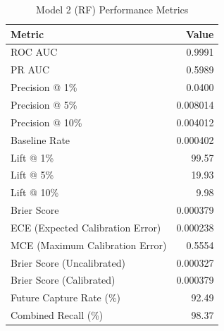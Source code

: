 \begin{table}[h]
\centering
\begin{tabular}{lr}
\toprule
Metric & Value \\
\midrule
ROC AUC & 0.9991 \\
PR AUC & 0.5989 \\
Precision @ 1\% & 0.0400 \\
Precision @ 5\% & 0.008014 \\
Precision @ 10\% & 0.004012 \\
Baseline Rate & 0.000402 \\
Lift @ 1\% & 99.57 \\
Lift @ 5\% & 19.93 \\
Lift @ 10\% & 9.98 \\
Brier Score & 0.000379 \\
ECE (Expected Calibration Error) & 0.000238 \\
MCE (Maximum Calibration Error) & 0.5554 \\
Brier Score (Uncalibrated) & 0.000327 \\
Brier Score (Calibrated) & 0.000379 \\
Future Capture Rate (\%) & 92.49 \\
Combined Recall (\%) & 98.37 \\
\bottomrule
\end{tabular}
\caption{Model 2 (RF) Performance Metrics}
\label{tab:model2_rf_metrics}
\end{table}
